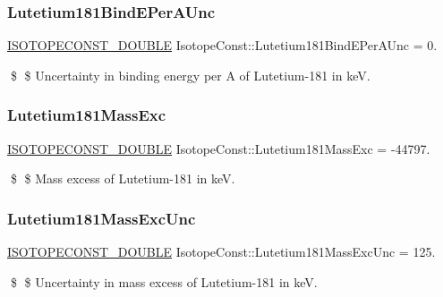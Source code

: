 \subsubsection{\texorpdfstring{Lutetium181\+Bind\+E\+Per\+A\+Unc}{Lutetium181BindEPerAUnc}}
{\footnotesize\ttfamily \mbox{\hyperlink{group___isotope_const-_macros_ga8f45a7272ce02c0b4c65c44636ed719a}{I\+S\+O\+T\+O\+P\+E\+C\+O\+N\+S\+T\+\_\+\+D\+O\+U\+B\+LE}} Isotope\+Const\+::\+Lutetium181\+Bind\+E\+Per\+A\+Unc = 0.}

\$ \$ Uncertainty in binding energy per A of Lutetium-\/181 in keV. \mbox{\label{group___isotope_const-_lutetium-_lu181_gab1d18028cc75a83f79531e4caed5ea64}} 
\subsubsection{\texorpdfstring{Lutetium181\+Mass\+Exc}{Lutetium181MassExc}}
{\footnotesize\ttfamily \mbox{\hyperlink{group___isotope_const-_macros_ga8f45a7272ce02c0b4c65c44636ed719a}{I\+S\+O\+T\+O\+P\+E\+C\+O\+N\+S\+T\+\_\+\+D\+O\+U\+B\+LE}} Isotope\+Const\+::\+Lutetium181\+Mass\+Exc = -\/44797.}

\$ \$ Mass excess of Lutetium-\/181 in keV. \mbox{\label{group___isotope_const-_lutetium-_lu181_ga0017c4df663d45c066b662f43bcd0f92}} 
\subsubsection{\texorpdfstring{Lutetium181\+Mass\+Exc\+Unc}{Lutetium181MassExcUnc}}
{\footnotesize\ttfamily \mbox{\hyperlink{group___isotope_const-_macros_ga8f45a7272ce02c0b4c65c44636ed719a}{I\+S\+O\+T\+O\+P\+E\+C\+O\+N\+S\+T\+\_\+\+D\+O\+U\+B\+LE}} Isotope\+Const\+::\+Lutetium181\+Mass\+Exc\+Unc = 125.}

\$ \$ Uncertainty in mass excess of Lutetium-\/181 in keV. \mbox{\label{group___isotope_const-_lutetium-_lu181_ga13e719364552a25001319f75ef50c9e8}} 
